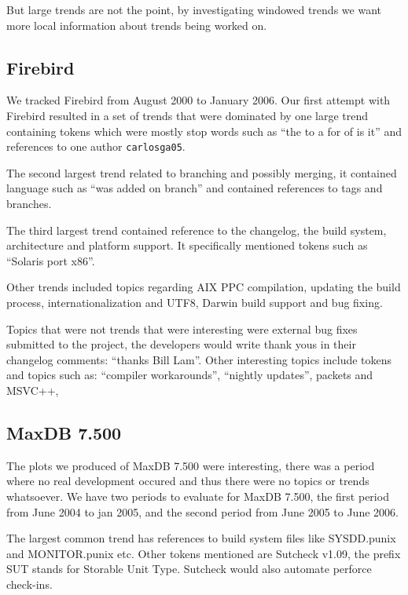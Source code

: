 \documentclass[times, 10pt,twocolumn]{article}
\begin{document}
But large trends are not the point, by investigating windowed trends
we want more local information about trends being worked on.

\subsection{Firebird}


We tracked Firebird from August 2000 to January 2006.
Our first attempt with Firebird resulted in a set of trends that were
dominated by one large trend containing tokens which were mostly stop
words such as ``the to a for of is it'' and references to one author
\texttt{carlosga05}. 

The second largest trend related to branching and possibly merging, it
contained language such as ``was added on branch'' and contained
references to tags and branches.

The third largest trend contained reference to the changelog, the
build system, architecture and platform support. It specifically
mentioned tokens such as ``Solaris port x86''.

Other trends included topics regarding AIX PPC compilation, updating
the build process, internationalization and UTF8, Darwin build support
and bug fixing.

Topics that were not trends that were interesting were external bug
fixes submitted to the project, the developers would write thank yous
in their changelog comments: ``thanks Bill Lam''. Other interesting
topics include tokens and topics such as: ``compiler workarounds'', ``nightly updates'', packets and MSVC++, 

\subsection{MaxDB 7.500}

The plots we produced of MaxDB 7.500 were interesting, there was a
period where no real development occured and thus there were no topics or trends
whatsoever. We have two periods to evaluate for MaxDB 7.500, the first
period from June 2004 to jan 2005, and the second period from June
2005 to June 2006.

The largest common trend has references to build system files like
SYSDD.punix and MONITOR.punix etc. Other tokens mentioned are Sutcheck
v1.09, the prefix SUT stands for Storable Unit Type. Sutcheck would
also automate perforce check-ins.
\end{document}
